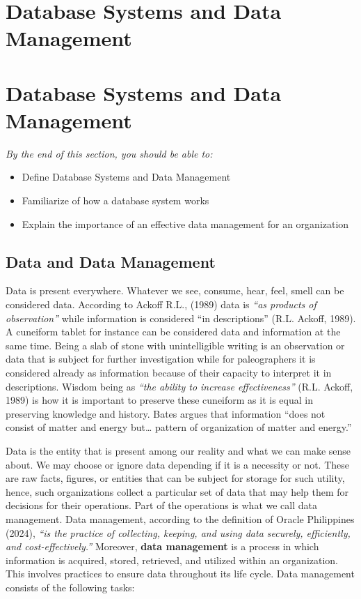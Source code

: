 \documentclass[
  letterpaper,
  DIV=11,
  numbers=noendperiod]{scrreprt}
\providecommand{\tightlist}{%
  \setlength{\itemsep}{0pt}\setlength{\parskip}{0pt}}\usepackage{longtable,booktabs,array}
\begin{document}

\chapter{Database Systems and Data
Management}\label{database-systems-and-data-management}


\chapter{Database Systems and Data
Management}\label{database-systems-and-data-management-1}

\emph{By the end of this section, you should be able to:}

\begin{itemize}
\tightlist
\item
  Define Database Systems and Data Management
\item
  Familiarize of how a database system works
\item
  Explain the importance of an effective data management for an
  organization
\end{itemize}

\section{Data and Data Management}\label{data-and-data-management}

Data is present everywhere. Whatever we see, consume, hear, feel, smell
can be considered data. According to Ackoff R.L., (1989) data is
\emph{``as products of observation''} while information is considered
``in descriptions'' (R.L. Ackoff, 1989). A cuneiform tablet for instance
can be considered data and information at the same time. Being a slab of
stone with unintelligible writing is an observation or data that is
subject for further investigation while for paleographers it is
considered already as information because of their capacity to interpret
it in descriptions. Wisdom being as \emph{``the ability to increase
effectiveness''} (R.L. Ackoff, 1989) is how it is important to preserve
these cuneiform as it is equal in preserving knowledge and history.
Bates argues that information ``does not consist of matter and energy
but\ldots{} pattern of organization of matter and energy.''

Data is the entity that is present among our reality and what we can
make sense about. We may choose or ignore data depending if it is a
necessity or not. These are raw facts, figures, or entities that can be
subject for storage for such utility, hence, such organizations collect
a particular set of data that may help them for decisions for their
operations. Part of the operations is what we call data management. Data
management, according to the definition of Oracle Philippines (2024),
\emph{``is the practice of collecting, keeping, and using data securely,
efficiently, and cost-effectively.''} Moreover, \textbf{data management}
is a process in which information is acquired, stored, retrieved, and
utilized within an organization. This involves practices to ensure data
throughout its life cycle. Data management consists of the following
tasks:
\end{document}
